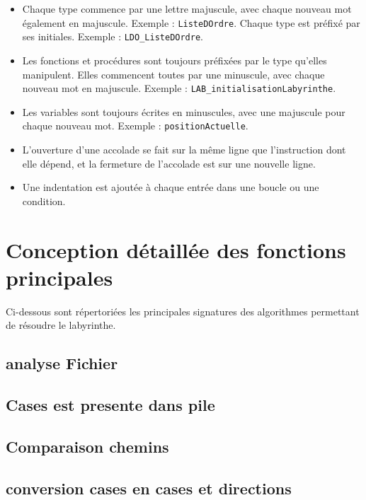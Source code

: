             \begin{itemize}
                    \item Chaque type commence par une lettre majuscule, avec chaque nouveau mot également en majuscule. Exemple : \texttt{ListeDOrdre}. Chaque type est préfixé par ses initiales. Exemple : \texttt{LDO\_ListeDOrdre}.
                    \item Les fonctions et procédures sont toujours préfixées par le type qu'elles manipulent. Elles commencent toutes par une minuscule, avec chaque nouveau mot en majuscule. Exemple : \texttt{LAB\_initialisationLabyrinthe}.
                    \item Les variables sont toujours écrites en minuscules, avec une majuscule pour chaque nouveau mot. Exemple : \texttt{positionActuelle}.
                    \item L'ouverture d'une accolade se fait sur la même ligne que l'instruction dont elle dépend, et la fermeture de l'accolade est sur une nouvelle ligne.
                    \item Une indentation est ajoutée à chaque entrée dans une boucle ou une condition.
            \end{itemize}



    \section{Conception détaillée des fonctions principales}
        Ci-dessous sont répertoriées les principales signatures des algorithmes permettant de résoudre le labyrinthe.
        \vspace{0.2mm}
        \subsection{analyse Fichier}
             
        \subsection{Cases est presente dans pile}
             
        \subsection{Comparaison chemins}
             
        \subsection{conversion cases en cases et directions}
             
